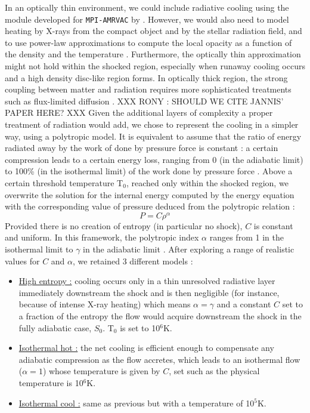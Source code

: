 \documentclass{aa}
\begin{document}
In an optically thin environment, we could include radiative cooling using the module developed for \texttt{MPI-AMRVAC} by \cite{VanMarle2011}. However, we would also need to model heating by X-rays from the compact object and by the stellar radiation field, and to use power-law approximations to compute the local opacity as a function of the density and the temperature \citep{Lin1985}. Furthermore, the optically thin approximation might not hold within the shocked region, especially when runaway cooling occurs and a high density disc-like region forms. In optically thick region, the strong coupling between matter and radiation requires more sophisticated treatments such as flux-limited diffusion \citep{Turner2001}. XXX RONY : SHOULD WE CITE JANNIS' PAPER HERE? XXX Given the additional layers of complexity a proper treatment of radiation would add, we chose to represent the cooling in a simpler way, using a polytropic model. It is equivalent to assume that the ratio of energy radiated away by the work of done by pressure force is constant : a certain compression leads to a certain energy loss, ranging from 0 (in the adiabatic limit) to 100\% (in the isothermal limit) of the work done by pressure force \citep{Christians2012}. Above a certain threshold temperature T$_{0}$, reached only within the shocked region, we overwrite the solution for the internal energy computed by the energy equation with the corresponding value of pressure deduced from the polytropic relation :
\begin{equation}
P=C\rho^{\alpha}
\end{equation}
Provided there is no creation of entropy (in particular no shock), $C$ is constant and uniform. In this framework, the polytropic index $\alpha$ ranges from 1 in the isothermal limit to $\gamma$ in the adiabatic limit \citep{Horedt2000}. After exploring a range of realistic values for $C$ and $\alpha$, we retained 3 different models :
\begin{itemize}
\item \underline{High entropy :} cooling occurs only in a thin unresolved radiative layer immediately downstream the shock and is then negligible (for instance, because of intense X-ray heating) which means $\alpha=\gamma$ and a constant $C$ set to a fraction of the entropy the flow would acquire downstream the shock in the fully adiabatic case, $S_0$. T$_{0}$ is set to 10$^6$K.
\item \underline{Isothermal hot :} the net cooling is efficient enough to compensate any adiabatic compression as the flow accretes, which leads to an isothermal flow ($\alpha=1$) whose temperature is given by $C$, set such as the physical temperature is 10$^6$K. 
\item \underline{Isothermal cool :} same as previous but with a temperature of 10$^5$K.
\end{itemize}
\end{document}
